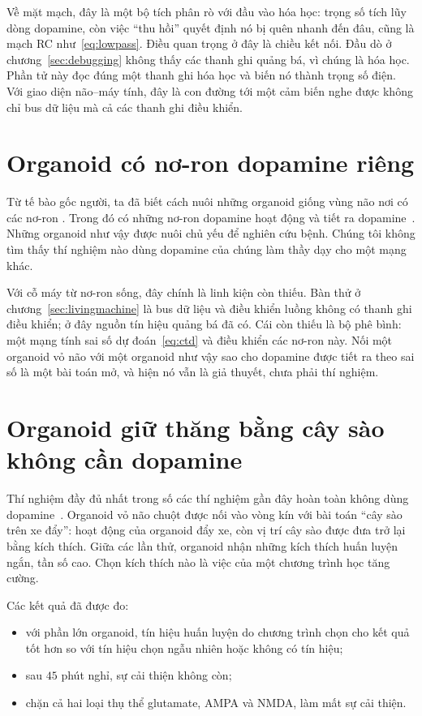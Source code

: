 Về mặt mạch, đây là một bộ tích phân rò với đầu vào hóa học: trọng số tích lũy dòng dopamine, còn việc ``thu hồi'' quyết định nó bị quên nhanh đến đâu, cũng là mạch RC như~\eqref{eq:lowpass}. Điều quan trọng ở đây là chiều kết nối. Đầu dò ở chương~\ref{sec:debugging} không thấy các thanh ghi quảng bá, vì chúng là hóa học. Phần tử này đọc đúng một thanh ghi hóa học và biến nó thành trọng số điện. Với giao diện não--máy tính, đây là con đường tới một cảm biến nghe được không chỉ bus dữ liệu mà cả các thanh ghi điều khiển.

\section{Organoid có nơ-ron dopamine riêng}
\label{sec:midbrainorg}

Từ tế bào gốc người, ta đã biết cách nuôi những organoid giống vùng não nơi có các nơ-ron . Trong đó có những nơ-ron dopamine hoạt động và tiết ra dopamine~\cite{Jo2016}. Những organoid như vậy được nuôi chủ yếu để nghiên cứu bệnh. Chúng tôi không tìm thấy thí nghiệm nào dùng dopamine của chúng làm thầy dạy cho một mạng khác.

Với cỗ máy từ nơ-ron sống, đây chính là linh kiện còn thiếu. Bàn thử ở chương~\ref{sec:livingmachine} là bus dữ liệu và điều khiển luồng không có thanh ghi điều khiển; ở đây nguồn tín hiệu quảng bá đã có. Cái còn thiếu là bộ phê bình: một mạng tính sai số dự đoán~\eqref{eq:ctd} và điều khiển các nơ-ron này. Nối một organoid vỏ não với một organoid như vậy sao cho dopamine được tiết ra theo sai số là một bài toán mở, và hiện nó vẫn là giả thuyết, chưa phải thí nghiệm.

\section{Organoid giữ thăng bằng cây sào không cần dopamine}
\label{sec:cartpole}

Thí nghiệm đầy đủ nhất trong số các thí nghiệm gần đây hoàn toàn không dùng dopamine~\cite{Robbins2026}. Organoid vỏ não chuột được nối vào vòng kín với bài toán ``cây sào trên xe đẩy'': hoạt động của organoid đẩy xe, còn vị trí cây sào được đưa trở lại bằng kích thích. Giữa các lần thử, organoid nhận những kích thích huấn luyện ngắn, tần số cao. Chọn kích thích nào là việc của một chương trình học tăng cường.

Các kết quả đã được đo:
\begin{itemize}
\item với phần lớn organoid, tín hiệu huấn luyện do chương trình chọn cho kết quả tốt hơn so với tín hiệu chọn ngẫu nhiên hoặc không có tín hiệu;
\item sau $45$ phút nghỉ, sự cải thiện không còn;
\item chặn cả hai loại thụ thể glutamate, AMPA và NMDA, làm mất sự cải thiện.
\end{itemize}

